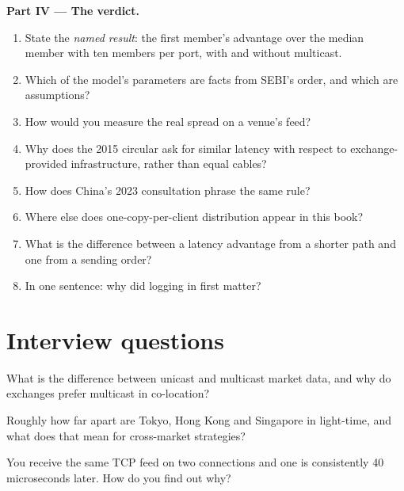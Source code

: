 \begin{problem}
\medskip\noindent\textbf{Part IV --- The verdict.}
\begin{enumerate}[resume]
\item State the \emph{named result}: the first member's advantage over the median member with ten members per port, with and without multicast.
\item Which of the model's parameters are facts from SEBI's order, and which are assumptions?
\item How would you measure the real spread on a venue's feed?
\item Why does the 2015 circular ask for similar latency with respect to exchange-provided infrastructure, rather than equal cables?
\item How does China's 2023 consultation phrase the same rule?
\item Where else does one-copy-per-client distribution appear in this book?
\item What is the difference between a latency advantage from a shorter path and one from a sending order?
\item In one sentence: why did logging in first matter?
\end{enumerate}
\end{problem}

\section{Interview questions}

\begin{interviewq}\label{iq:nw:the-asia-pacific-map:1}
What is the difference between unicast and multicast market data, and why do exchanges prefer multicast in co-location?
\end{interviewq}

\begin{interviewq}\label{iq:nw:the-asia-pacific-map:2}
Roughly how far apart are Tokyo, Hong Kong and Singapore in light-time, and what does that mean for cross-market strategies?
\end{interviewq}

\begin{interviewq}\label{iq:nw:the-asia-pacific-map:3}
You receive the same TCP feed on two connections and one is consistently 40 microseconds later. How do you find out why?
\end{interviewq}

